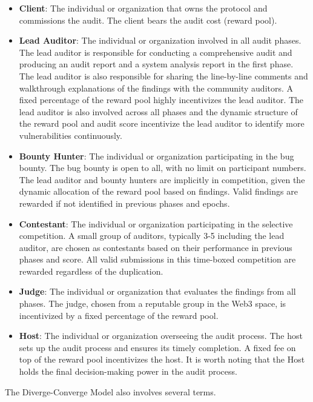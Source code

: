 \documentclass[10pt]{extarticle}
\def\tightlist{}
\begin{document}
\begin{itemize}
\tightlist
\item
  \textbf{Client}: The individual or organization that owns the protocol
  and commissions the audit. The client bears the audit cost (reward
  pool).
\item
  \textbf{Lead Auditor}: The individual or organization involved in all
  audit phases. The lead auditor is responsible for conducting a
  comprehensive audit and producing an audit report and a system
  analysis report in the first phase. The lead auditor is also
  responsible for sharing the line-by-line comments and walkthrough
  explanations of the findings with the community auditors. A fixed
  percentage of the reward pool highly incentivizes the lead auditor.
  The lead auditor is also involved across all phases and the dynamic
  structure of the reward pool and audit score incentivize the lead
  auditor to identify more vulnerabilities continuously.
\item
  \textbf{Bounty Hunter}: The individual or organization participating
  in the bug bounty. The bug bounty is open to all, with no limit on
  participant numbers. The lead auditor and bounty hunters are
  implicitly in competition, given the dynamic allocation of the reward
  pool based on findings. Valid findings are rewarded if not identified
  in previous phases and epochs.
\item
  \textbf{Contestant}: The individual or organization participating in
  the selective competition. A small group of auditors, typically 3-5
  including the lead auditor, are chosen as contestants based on their
  performance in previous phases and score. All valid submissions in
  this time-boxed competition are rewarded regardless of the
  duplication.
\item
  \textbf{Judge}: The individual or organization that evaluates the
  findings from all phases. The judge, chosen from a reputable group in
  the Web3 space, is incentivized by a fixed percentage of the reward
  pool.
\item
  \textbf{Host}: The individual or organization overseeing the audit
  process. The host sets up the audit process and ensures its timely
  completion. A fixed fee on top of the reward pool incentivizes the
  host. It is worth noting that the Host holds the final decision-making
  power in the audit process.
\end{itemize}

The Diverge-Converge Model also involves several terms.
\end{document}
